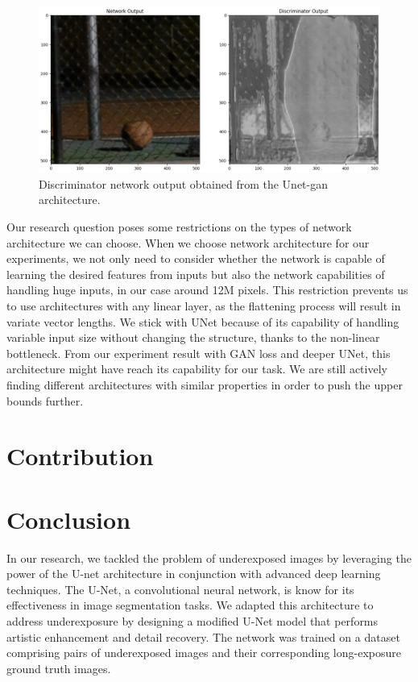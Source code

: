 \documentclass{article}
\begin{document}
\begin{figure}[t]
  \centering
  \includegraphics[width=\textwidth]{UnetGAN.png} %
  \caption{Discriminator network output obtained from the Unet-gan architecture.}
  \label{fig:vae-diagram}
\end{figure}

Our research question poses some restrictions on the types of network architecture we can choose. When we choose network architecture for our experiments, we not only need to consider whether the network is capable of learning the desired features from inputs but also the network capabilities of handling huge inputs, in our case around 12M pixels. This restriction prevents us to use architectures with any linear layer, as the flattening process will result in variate vector lengths. We stick with UNet because of its capability of handling variable input size without changing the structure, thanks to the non-linear bottleneck. From our experiment result with GAN loss and deeper UNet, this architecture might have reach its capability for our task. We are still actively finding different architectures with similar properties in order to push the upper bounds further. 

\section{Contribution}


\section{Conclusion}
In our research, we tackled the problem of underexposed images by leveraging the power of the U-net architecture in conjunction with advanced deep learning techniques. The U-Net, a convolutional neural network, is know for its effectiveness in image segmentation tasks. We adapted this architecture to address underexposure by designing a modified U-Net model that performs artistic enhancement and detail recovery. The network was trained on a dataset comprising pairs of underexposed images and their corresponding long-exposure ground truth images.
\end{document}
